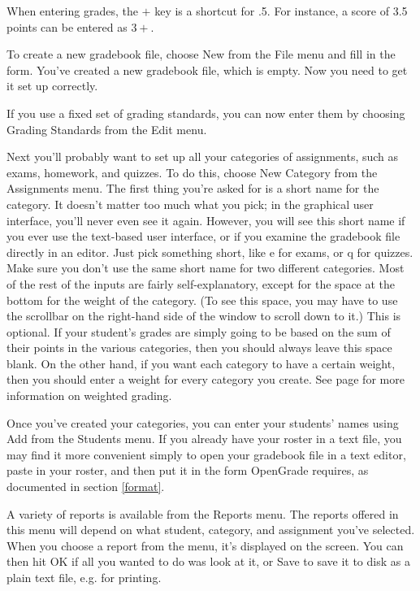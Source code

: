 \documentclass{opengrade_doc}
\begin{document}
When entering grades, the $+$ key is a shortcut for .5. 
For instance, a score of 3.5 points can be entered as $3+$.

To create a new gradebook file, choose New from the File menu
and fill in the form. You've created a new gradebook file, which
is empty. Now you need to get it set up correctly.

If you use a fixed set of grading standards, you can now enter
them by choosing Grading Standards from the Edit menu.

Next you'll probably want to set up all your categories of
assignments, such as exams, homework, and quizzes. To do this,
choose New Category from the Assignments menu. The first thing
you're asked for is a short name for the category.
It doesn't matter too much what you pick; in the graphical
user interface, you'll never even see it again. However, you will
see this short name if you ever use the text-based user interface,
or if you examine the gradebook file directly in an editor.
Just pick something short, like e for exams, or q for quizzes.
Make sure you don't use the same short name for two different
categories. Most of the rest of the inputs are fairly self-explanatory,
except for the space at the bottom for the weight of the category.
(To see this space, you may have to use the scrollbar on the right-hand
side of the window to scroll down to it.)
This is optional. If your student's grades are simply going to be
based on the sum of their points in the various categories, then
you should always leave this space blank. On the other hand, if you
want each category to have a certain weight, then you should enter
a weight for every category you create. See page
\pageref{weightedgrading} for more information on weighted grading.

Once you've created your categories, you can enter your students'
names using Add from the Students menu. If you already have your
roster in a text file, you may find it more convenient simply to
open your gradebook file in a text editor, paste in your roster,
and then put it in the form OpenGrade requires, as documented in
section \ref{format}.

A variety of reports is available from the Reports menu.
The reports offered in this menu will depend on what student,
category, and assignment you've selected. When you choose
a report from the menu, it's displayed on the screen. You can
then hit OK if all you wanted to do was look at it, or Save
to save it to disk as a plain text file, e.g. for printing.
\end{document}
